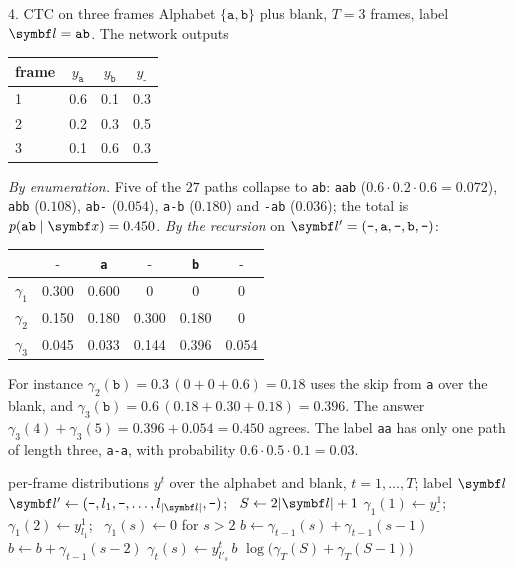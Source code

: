 \documentclass[11pt]{article}
\newcommand{\blank}{\texttt{-}}
\begin{document}
\begin{worked}{4. CTC on three frames}
Alphabet $\{\texttt{a}, \texttt{b}\}$ plus blank, $T = 3$ frames, label $\vect{l} = \texttt{ab}$. The network outputs
\begin{center}\small
\begin{tabular}{@{}lccc@{}}
\toprule
frame & $y_{\texttt{a}}$ & $y_{\texttt{b}}$ & $y_{\blank}$ \\
\midrule
1 & 0.6 & 0.1 & 0.3 \\
2 & 0.2 & 0.3 & 0.5 \\
3 & 0.1 & 0.6 & 0.3 \\
\bottomrule
\end{tabular}
\end{center}
\emph{By enumeration.} Five of the $27$ paths collapse to \texttt{ab}: \texttt{aab} ($0.6 \cdot 0.2 \cdot 0.6 = 0.072$),
\texttt{abb} ($0.108$), \texttt{ab-} ($0.054$), \texttt{a-b} ($0.180$) and \texttt{-ab} ($0.036$); the total is
$p(\texttt{ab} \mid \x) = 0.450$.
\emph{By the recursion} on $\vect{l}' = (\blank, \texttt{a}, \blank, \texttt{b}, \blank)$:
\begin{center}\small
\begin{tabular}{@{}lccccc@{}}
\toprule
& $\blank$ & \texttt{a} & $\blank$ & \texttt{b} & $\blank$ \\
\midrule
$\gamma_1$ & 0.300 & 0.600 & 0 & 0 & 0 \\
$\gamma_2$ & 0.150 & 0.180 & 0.300 & 0.180 & 0 \\
$\gamma_3$ & 0.045 & 0.033 & 0.144 & 0.396 & 0.054 \\
\bottomrule
\end{tabular}
\end{center}
For instance $\gamma_2(\texttt{b}) = 0.3\,(0 + 0 + 0.6) = 0.18$ uses the skip from \texttt{a} over the blank, and
$\gamma_3(\texttt{b}) = 0.6\,(0.18 + 0.30 + 0.18) = 0.396$. The answer $\gamma_3(4) + \gamma_3(5) = 0.396 + 0.054 = 0.450$ agrees.
The label \texttt{aa} has only one path of length three, \texttt{a-a}, with probability $0.6 \cdot 0.5 \cdot 0.1 = 0.03$.
\end{worked}

\begin{algorithm}[htbp]
\caption{CTC forward pass}\label{alg:ctc}
\begin{algorithmic}[1]
\Require per-frame distributions $y^t$ over the alphabet and blank, $t = 1, \dots, T$; label $\vect{l}$
  \State $\vect{l}' \gets (\blank, l_1, \blank, \dots, l_{|\vect{l}|}, \blank)$; \ $S \gets 2|\vect{l}| + 1$
  \State $\gamma_1(1) \gets y^1_{\blank}$; \ $\gamma_1(2) \gets y^1_{l_1}$; \ $\gamma_1(s) \gets 0$ for $s > 2$
      \State $b \gets \gamma_{t-1}(s) + \gamma_{t-1}(s - 1)$ 
      \If{$l'_s \ne \blank$ and $s > 2$ and $l'_s \ne l'_{s-2}$} $b \gets b + \gamma_{t-1}(s - 2)$ 
      \EndIf
      \State $\gamma_t(s) \gets y^t_{l'_s}\, b$
    \EndFor
  \EndFor
  \State \Return $\log\big(\gamma_T(S) + \gamma_T(S - 1)\big)$ 
\EndFunction
\end{algorithmic}
\end{algorithm}
\end{document}
